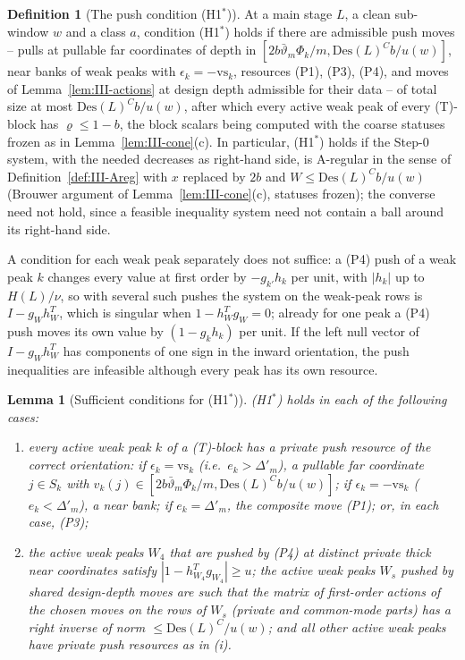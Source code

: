 \documentclass[10pt]{amsart}
\newtheorem{lemma}[theorem]{Lemma}
\theoremstyle{definition}
\newtheorem{definition}[theorem]{Definition}
\theoremstyle{remark}
\begin{document}
\begin{definition}[The push condition \textup{(H1$^*$)}]\label{def:III-H1}
At a main stage $L$, a clean sub-window $w$ and a class $a$, condition
\textup{(H1$^*$)} holds if there are admissible push moves -- pulls at pullable
far coordinates of depth in $[2b\bar\vartheta_m\Phi_k/m,\mathrm{Des}(L)^Cb/u(w)]$,
near banks of weak peaks with $\epsilon_k=-\mathrm{vs}_k$, resources (P1), (P3),
(P4), and moves of Lemma~\ref{lem:III-actions} at design depth admissible for
their data -- of total size at most $\mathrm{Des}(L)^Cb/u(w)$, after which
every active weak peak of every (T)-block has $\varrho\le1-b$, the block
scalars being computed with the coarse statuses frozen as in
Lemma~\ref{lem:III-cone}(c).  In particular, (H1$^*$) holds if the Step-0
system, with the needed decreases as right-hand side, is A-regular in the
sense of Definition~\ref{def:III-Areg} with $x$ replaced by $2b$ and
$W\le\mathrm{Des}(L)^Cb/u(w)$ (Brouwer argument of
Lemma~\ref{lem:III-cone}(c), statuses frozen); the converse need not hold,
since a feasible inequality system need not contain a ball around its
right-hand side.
\end{definition}

A condition for each weak peak separately does not suffice: a (P4) push of a
weak peak $k$ changes every value at first order by $-g_{k'}h_k$ per unit, with
$|h_k|$ up to $H(L)/\nu$, so with several such pushes the system on the
weak-peak rows is $I-g_Wh_W^T$, which is singular when $1-h_W^Tg_W=0$; already
for one peak a (P4) push moves its own value by $(1-g_kh_k)$ per unit.  If the
left null vector of $I-g_Wh_W^T$ has components of one sign in the inward
orientation, the push inequalities are infeasible although every peak has its own
resource.

\begin{lemma}[Sufficient conditions for \textup{(H1$^*$)}]\label{lem:III-H1suff}
\textup{(H1$^*$)} holds in each of the following cases:
\begin{enumerate}
\item[(i)] every active weak peak $k$ of a (T)-block has a \emph{private} push
resource of the correct orientation: if $\epsilon_k=\mathrm{vs}_k$ (i.e.\
$e_k>\Delta'_m$), a pullable far coordinate $j\in S_k$ with $v_k(j)\in
[2b\bar\vartheta_m\Phi_k/m,\mathrm{Des}(L)^Cb/u(w)]$; if $\epsilon_k=
-\mathrm{vs}_k$ ($e_k<\Delta'_m$), a near bank; if $e_k=\Delta'_m$, the composite
move (P1); or, in each case, (P3);
\item[(ii)] the active weak peaks $W_4$ that are pushed by (P4) at distinct
private thick near coordinates satisfy $|1-h_{W_4}^Tg_{W_4}|\ge u$; the
active weak peaks $W_s$ pushed by shared design-depth moves are such that
the matrix of first-order actions of the chosen moves on the rows of $W_s$
(private and common-mode parts) has a right inverse of norm
$\le\mathrm{Des}(L)^C/u(w)$; and all other active weak peaks have private push
resources as in (i).
\end{enumerate}
\end{lemma}
\end{document}
